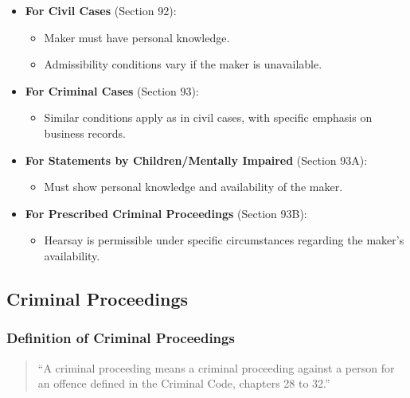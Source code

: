 \begin{itemize}
\tightlist
\item
  \textbf{For Civil Cases} (Section 92):

  \begin{itemize}
  \tightlist
  \item
    Maker must have personal knowledge.
  \item
    Admissibility conditions vary if the maker is unavailable.
  \end{itemize}
\item
  \textbf{For Criminal Cases} (Section 93):

  \begin{itemize}
  \tightlist
  \item
    Similar conditions apply as in civil cases, with specific emphasis
    on business records.
  \end{itemize}
\item
  \textbf{For Statements by Children/Mentally Impaired} (Section 93A):

  \begin{itemize}
  \tightlist
  \item
    Must show personal knowledge and availability of the maker.
  \end{itemize}
\item
  \textbf{For Prescribed Criminal Proceedings} (Section 93B):

  \begin{itemize}
  \tightlist
  \item
    Hearsay is permissible under specific circumstances regarding the
    maker's availability.
  \end{itemize}
\end{itemize}

\subsection{  Criminal Proceedings}\label{criminal-proceedings}

\subsubsection{Definition of Criminal
Proceedings}\label{definition-of-criminal-proceedings}

\begin{quote}
``A criminal proceeding means a criminal proceeding against a person for
an offence defined in the Criminal Code, chapters 28 to 32.''
\end{quote}

